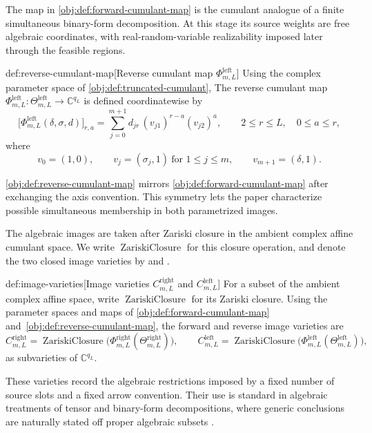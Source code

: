 \documentclass[11pt]{article}
\begin{document}
The map in \cref{obj:def:forward-cumulant-map} is the cumulant analogue of a finite simultaneous binary-form decomposition. At this stage its source weights are free algebraic coordinates, with real-random-variable realizability imposed later through the feasible regions.

\begin{definitionv}{def:reverse-cumulant-map}[Reverse cumulant map \(\Phi^{\mathrm{left}}_{m,L}\)]
Using the complex parameter space of \cref{obj:def:truncated-cumulant}, The reverse cumulant map \(\Phi^{\mathrm{left}}_{m,L}:\Theta^{\mathrm{left}}_{m,L}\to\mathbb C^{q_L}\) is defined coordinatewise by
\[
\bigl[\Phi^{\mathrm{left}}_{m,L}(\delta,\sigma,d)\bigr]_{r,a}
=
\sum_{j=0}^{m+1}
d_{jr}\,(v_{j1})^{r-a}(v_{j2})^a,
\qquad
2\le r\le L,\quad 0\le a\le r,
\]
where
\[
v_0=(1,0),\qquad
v_j=(\sigma_j,1)\ \text{for }1\le j\le m,\qquad
v_{m+1}=(\delta,1).
\]
\end{definitionv}

\cref{obj:def:reverse-cumulant-map} mirrors \cref{obj:def:forward-cumulant-map} after exchanging the axis convention. This symmetry lets the paper characterize possible simultaneous membership in both parametrized images.

The algebraic images are taken after Zariski closure in the ambient complex affine cumulant space. We write \(\operatorname{ZariskiClosure}\) for this closure operation, and denote the two closed image varieties by  and .

\begin{definitionv}{def:image-varieties}[Image varieties \(C^{\mathrm{right}}_{m,L}\) and \(C^{\mathrm{left}}_{m,L}\)]
For a subset of the ambient complex affine space, write \(\operatorname{ZariskiClosure}\) for its Zariski closure. Using the parameter spaces and maps of \cref{obj:def:forward-cumulant-map} and~\cref{obj:def:reverse-cumulant-map}, the forward and reverse image varieties are
\[
C^{\mathrm{right}}_{m,L}
=
\operatorname{ZariskiClosure}
\bigl(\Phi^{\mathrm{right}}_{m,L}(\Theta^{\mathrm{right}}_{m,L})\bigr),
\qquad
C^{\mathrm{left}}_{m,L}
=
\operatorname{ZariskiClosure}
\bigl(\Phi^{\mathrm{left}}_{m,L}(\Theta^{\mathrm{left}}_{m,L})\bigr),
\]
as subvarieties of \(\mathbb C^{q_L}\).
\end{definitionv}

These varieties record the algebraic restrictions imposed by a fixed number of source slots and a fixed arrow convention. Their use is standard in algebraic treatments of tensor and binary-form decompositions, where generic conclusions are naturally stated off proper algebraic subsets \citep{ComonMourrain1996,Landsberg2012}.
\end{document}
